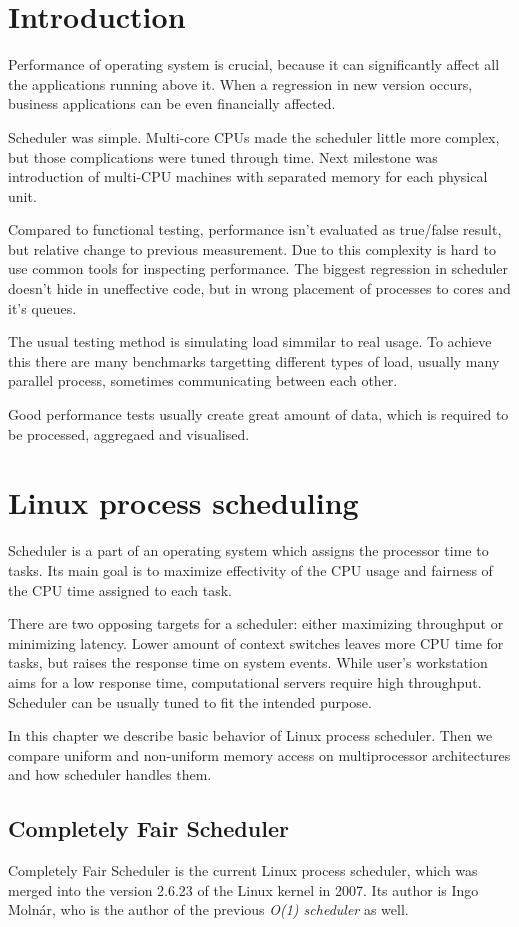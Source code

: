 \chapter{Introduction}
Performance of operating system is crucial, because it can significantly affect all the applications running above it.
When a regression in new version occurs, business applications can be even financially affected.

Scheduler was simple. Multi-core CPUs made the scheduler little more complex, but those complications were tuned through time.
Next milestone was introduction of multi-CPU machines with separated memory for each physical unit.

Compared to functional testing, performance isn't evaluated as true/false result, but relative change to previous measurement.
Due to this complexity is hard to use common tools for inspecting performance.
The biggest regression in scheduler doesn't hide in uneffective code, but in wrong placement of processes to cores and it's queues.

The usual testing method is simulating load simmilar to real usage.
To achieve this there are many benchmarks targetting different types of load, usually many parallel process, sometimes communicating between each other.

Good performance tests usually create great amount of data, which is required to be processed, aggregaed and visualised.

\chapter{Linux process scheduling}
Scheduler is a part of an operating system which assigns the processor time to tasks.
Its main goal is to maximize effectivity of the CPU usage and fairness of the
CPU time assigned to each task.

There are two opposing targets for a scheduler: either maximizing throughput or
minimizing latency. Lower amount of context switches leaves more CPU time for
tasks, but raises the response time on system events.
While user's workstation aims for a low response time, computational servers
require high throughput. Scheduler can be usually tuned to fit the intended
purpose.

In this chapter we describe basic behavior of Linux process scheduler. Then we
compare uniform and non-uniform memory access on multiprocessor architectures
and how scheduler handles them.

\section{Completely Fair Scheduler}
Completely Fair Scheduler is the current Linux process scheduler, which was
merged into the version 2.6.23 of the Linux kernel in 2007. Its author is Ingo
Molnár, who is the author of the previous \emph{O(1) scheduler} as well.

